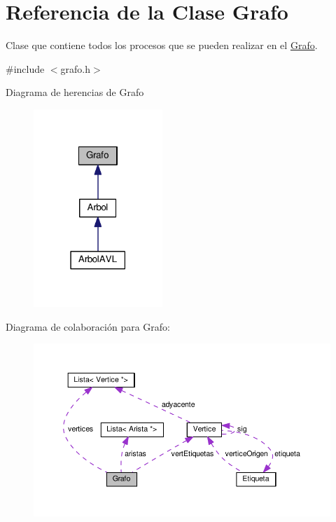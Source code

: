 \hypertarget{classGrafo}{}\section{Referencia de la Clase Grafo}
\label{classGrafo}


Clase que contiene todos los procesos que se pueden realizar en el \hyperlink{classGrafo}{Grafo}.  




{\ttfamily \#include $<$grafo.\+h$>$}



Diagrama de herencias de Grafo\nopagebreak
\begin{figure}[H]
\begin{center}
\leavevmode
\includegraphics[width=138pt]{classGrafo__inherit__graph}
\end{center}
\end{figure}


Diagrama de colaboración para Grafo\+:\nopagebreak
\begin{figure}[H]
\begin{center}
\leavevmode
\includegraphics[width=350pt]{classGrafo__coll__graph}
\end{center}
\end{figure}
